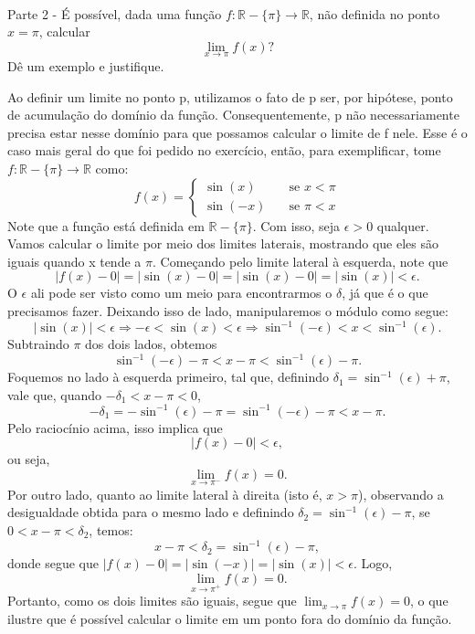 \paragraph{} Parte 2 - \'E poss\'ivel, dada uma fun\c c\~ao $f:\mathbb{R}-\{\pi\}\rightarrow \mathbb{R}$, n\~ao definida no ponto $x=\pi$, calcular 
$$
\lim_{x\to\pi}f(x)?
$$
D\^e um exemplo e justifique.
\begin{sol*}
Ao definir um limite no ponto p, utilizamos o fato de p ser, por hip\'otese, ponto de acumula\c c\~ao do dom\'inio da fun\c c\~ao. Consequentemente, p n\~ao necessariamente precisa estar nesse dom\'inio para que possamos calcular o limite de f nele. Esse \'e o caso mais geral do que foi pedido no exerc\'icio, ent\~ao, para exemplificar, tome $f:\mathbb{R}-\{\pi\}\rightarrow\mathbb{R}$ como:
$$
f(x) = \left\{\begin{array}{ll}
	\sin(x) & \quad \text{se } x < \pi \\
	\sin(-x) & \quad \text{se } \pi < x
\end{array}\right.
$$
Note que a fun\c c\~ao est\'a definida em $\mathbb{R}-\{\pi\}.$ Com isso, seja $\epsilon > 0$ qualquer. Vamos calcular o limite por meio dos limites laterais, mostrando que eles s\~ao iguais quando x tende a $\pi$. Come\c cando pelo limite lateral \`a esquerda, note que
$$
|f(x) - 0| = |\sin(x) - 0| = |\sin(x) - 0| = |\sin(x)|< \epsilon.
$$
O $\epsilon$ ali pode ser visto como um meio para encontrarmos o $\delta$, j\'a que \'e o que precisamos fazer. Deixando isso de lado, manipularemos o m\'odulo como segue:
$$
|\sin(x)| < \epsilon \Rightarrow -\epsilon < \sin(x) < \epsilon \Rightarrow \sin^{-1}(-\epsilon) < x < \sin^{-1}(\epsilon).
$$
Subtraindo $\pi$ dos dois lados, obtemos
$$
\sin^{-1}(-\epsilon) - \pi < x - \pi < \sin^{-1}(\epsilon) - \pi.
$$
Foquemos no lado \`a esquerda primeiro, tal que, definindo $\delta_1 = \sin^{-1}(\epsilon) + \pi$, vale que, quando $-\delta_1 < x - \pi < 0$, 
$$
-\delta_1 = -\sin^{-1}(\epsilon) - \pi = \sin^{-1}(-\epsilon) - \pi < x - \pi.
$$
Pelo racioc\'inio acima, isso implica que 
$$
|f(x) - 0| < \epsilon,
$$
ou seja, 
$$
\lim_{x\to\pi^{-}}f(x) = 0.
$$
Por outro lado, quanto ao limite lateral \`a direita (isto \'e, $x > \pi$), observando a desigualdade obtida para o mesmo lado e definindo $\delta_2 = \sin^{-1}(\epsilon) - \pi $, se $0 < x - \pi < \delta_2$, temos:
$$
x - \pi < \delta_2 = \sin^{-1}(\epsilon) - \pi,
$$
donde segue que $|f(x) - 0| = |\sin(-x)| = |\sin(x)| < \epsilon$. Logo,
$$
\lim_{x\to\pi^{+}}f(x) = 0.
$$
Portanto, como os dois limites s\~ao iguais, segue que $\lim_{x\to\pi} f(x) = 0$, o que ilustre que \'e poss\'ivel calcular o limite em um ponto fora do dom\'inio da fun\c c\~ao.
\qedsymbol
\end{sol*}

